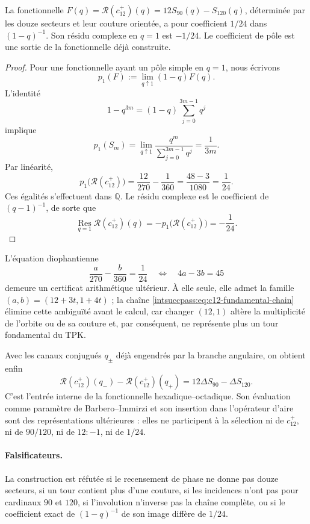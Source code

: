 \begin{theorem}
La fonctionnelle \(F(q)=\mathscr R(c_{12}^{+})(q)
=12S_{90}(q)-S_{120}(q)\), déterminée par les douze secteurs
et leur couture orientée, a pour coefficient \(1/24\) dans
\((1-q)^{-1}\). Son résidu complexe en \(q=1\) est \(-1/24\).
Le coefficient de pôle est une sortie de la fonctionnelle déjà construite.
\end{theorem}

\begin{proof}
Pour une fonctionnelle ayant un pôle simple en \(q=1\), nous écrivons
\[
 p_1(F):=\lim_{q\uparrow1}(1-q)F(q).
\]
L’identité
\[
 1-q^{3m}=(1-q)\sum_{j=0}^{3m-1}q^j
\]
implique
\[
 p_1(S_m)
 =\lim_{q\uparrow1}\frac{q^m}{\sum_{j=0}^{3m-1}q^j}
 =\frac1{3m}.
\]
Par linéarité,
\[
 p_1\bigl(\mathscr R(c_{12}^{+})\bigr)
 =\frac{12}{270}-\frac1{360}
 =\frac{48-3}{1080}=\frac1{24}.
\]
Ces égalités s’effectuent dans \(\mathbb Q\). Le résidu complexe
est le coefficient de \((q-1)^{-1}\), de sorte que
\[
 \operatorname*{Res}_{q=1}\mathscr R(c_{12}^{+})(q)
 =-p_1\bigl(\mathscr R(c_{12}^{+})\bigr)=-\frac1{24}.
\]
\end{proof}

L’équation diophantienne
\[
 \frac a{270}-\frac b{360}=\frac1{24}
 \quad\Longleftrightarrow\quad
 4a-3b=45
\]
demeure un certificat arithmétique ultérieur. À elle seule, elle admet la
famille \((a,b)=(12+3t,1+4t)\) ; la chaîne
\eqref{intsuccpass:eq:c12-fundamental-chain} élimine cette ambiguïté avant le calcul,
car changer \((12,1)\) altère la multiplicité de l’orbite ou de sa couture
et, par conséquent, ne représente plus un tour fondamental du TPK.

Avec les canaux conjugués \(q_\pm\) déjà engendrés par la branche angulaire, on
obtient enfin
\[
 \mathscr R(c_{12}^{+})(q_-)-
 \mathscr R(c_{12}^{+})(q_+)
 =12\Delta S_{90}-\Delta S_{120}.
\]
C’est l’entrée interne de la fonctionnelle hexadique--octadique. Son évaluation
comme paramètre de Barbero--Immirzi et son insertion dans l’opérateur d’aire sont
des représentations ultérieures : elles ne participent à la sélection
ni de \(c_{12}^{+}\), ni de \(90/120\), ni de \(12:-1\), ni de \(1/24\).

\paragraph{Falsificateurs.}
La construction est réfutée si le recensement de phase ne donne pas douze secteurs, si
un tour contient plus d’une couture, si les incidences n’ont pas pour
cardinaux \(90\) et \(120\), si l’involution n’inverse pas la chaîne complète,
ou si le coefficient exact de \((1-q)^{-1}\) de son image diffère de \(1/24\).
